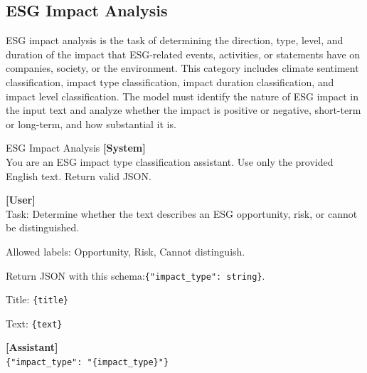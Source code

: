 \documentclass[11pt]{article}
\begin{document}
\subsection{ESG Impact Analysis}
ESG impact analysis is the task of determining the direction, type, level, and duration of the impact that ESG-related events, activities, or statements have on companies, society, or the environment. This category includes climate sentiment classification, impact type classification, impact duration classification, and impact level classification. The model must identify the nature of ESG impact in the input text and analyze whether the impact is positive or negative, short-term or long-term, and how substantial it is.
\begin{promptbox}{ESG Impact Analysis}
\small
\textbf{[System]}\\
You are an ESG impact type classification assistant. Use only the provided English text. Return valid JSON.

\vspace{0.6em}
\textbf{[User]}\\
Task: Determine whether the text describes an ESG opportunity, risk, or cannot be distinguished.

\vspace{0.3em}
Allowed labels: Opportunity, Risk, Cannot distinguish.

\vspace{0.3em}
Return JSON with this schema:\newline \texttt{\{"impact\_type": string\}}.

\vspace{0.3em}
Title: \texttt{\{title\}}

\vspace{0.3em}
Text: \texttt{\{text\}}

\vspace{0.6em}
\textbf{[Assistant]}\\
\texttt{\{"impact\_type": "\{impact\_type\}"\}}
\end{promptbox}
\end{document}
